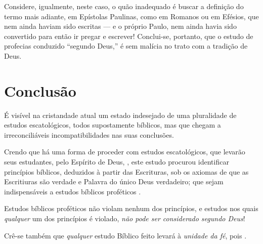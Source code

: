     Considere, igualmente, neste caso, o quão inadequado é buscar a definição do termo mais adiante, em Epístolas Paulinas, como
    em Romanos ou em Efésios, que nem ainda haviam sido escritas --- e o próprio Paulo, nem ainda  havia  sido  convertido  para
    então ir pregar e escrever! Conclui-se, portanto, que o estudo de profecias conduzido ``segundo Deus,''  é  sem  malícia  no
    trato com a tradição de Deus.



\section{Conclusão}

    É visível na cristandade atual um estado  indesejado  de  uma  pluralidade  de  estudos  escatológicos,  todos  supostamente
    bíblicos, mas que chegam a irreconciliáveis incompatibilidades nas suas conclusões.

    Crendo que há uma forma  de proceder
    com estudos  escatológicos, que levarão seus estudantes, pelo Espírito de Deus, , este estudo
    procurou identificar princípios bíblicos, deduzidos à partir das Escrituras, sob os axiomas de que as Escritiuras são
    verdade e Palavra do único Deus verdadeiro; que sejam indispensáveis a estudos bíblicos proféticos .

    Estudos bíblicos proféticos  não violam nenhum dos princípios, e estudos nos quais \emph{qualquer} um
    dos princípios é violado, \emph{não pode ser considerado segundo Deus}!

    Crê-se também que  \emph{qualquer}  estudo  Bíblico  feito    levará  à  \emph{unidade  da  fé},  pois
    .



